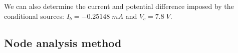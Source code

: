We can also determine the current and potential difference imposed by the conditional sources: $I_b = -0.25148\; mA$ and $V_c = 7.8\; V$.

\subsection{Node analysis method}


\lipsum[1-1]


